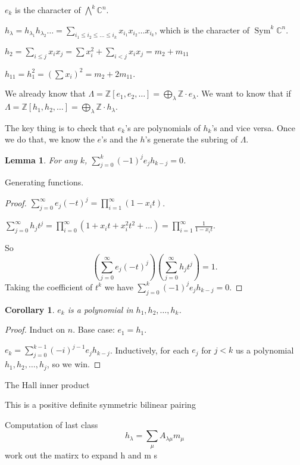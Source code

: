 \documentclass{report}
\newcommand{\C}{\mathbb{C}}
\newcommand{\Z}{\mathbb{Z}}
\def \Sym {\operatorname{Sym}}
\newtheorem{corollary}{Corollary}[section]
\newtheorem{lemma}{Lemma}[section]
\theoremstyle{definition}
\theoremstyle{remark}
\numberwithin{equation}{section}
\begin{document}
$e_k$ is the character of $\bigwedge^k \C^n$.

$h_\lambda = h_{\lambda_1}h_{\lambda_2}\ldots = \sum_{i_1 \leq i_2 \leq \ldots \leq i_k}x_{i_1}x_{i_2}\ldots x_{i_k}$, which is the character of $\Sym^k \C^n$.

$h_2 = \sum_{i \leq j}x_i x_j = \sum x_i^2 + \sum_{i < j} x_i x_j = m_2 + m_{11}$

$h_{11} = h_1^2 = \left(\sum x_i\right)^2 = m_2 + 2m_{11}$.

We already know that $\Lambda = \Z[e_1, e_2, \ldots] = \bigoplus_\lambda \Z \cdot e_\lambda$. We want to know that if $\Lambda = \Z[h_1, h_2, \ldots] = \bigoplus_\lambda \Z \cdot h_\lambda$.

The key thing is to check that $e_k$'s are polynomials of $h_k$'s and vice versa. Once we do that, we know the $e$'s and the $h$'s generate the subring of $\Lambda$.

\begin{lemma}
    For any $k$, $\sum_{j=0}^k (-1)^je_jh_{k-j} = 0$.
\end{lemma}
Generating functions.
\begin{proof}
    $\sum_{j=0}^\infty e_j (-t)^j = \prod_{i=1}^\infty (1 - x_i t)$.

    $\sum_{j=0}^\infty h_j t^j = \prod_{i=0}^\infty (1 + x_i t + x_i^2 t^2 + \ldots) = \prod_{i=1}^\infty \frac{1}{1 - x_it}$.

    So \[
        \left(\sum_{j=0}^\infty e_j (-t)^j\right)\left(\sum_{j=0}^\infty h_j t^j\right) = 1.
    \]
    Taking the coefficient of $t^k$ we have $\sum_{j=0}^k (-1)^je_jh_{k-j} = 0$.
\end{proof}

\begin{corollary}
    $e_k$ is a polynomial in $h_1, h_2, \ldots, h_k$.
\end{corollary}
\begin{proof}
    Induct on $n$. Base case: $e_1 = h_1$.

    $e_k = \sum_{j=0}^{k-1}(-i)^{j-1}e_j h_{k-j}$. Inductively, for each $e_j$ for $j < k$ us a polynomial $h_1, h_2, \ldots, h_j$, so we win.
\end{proof}

The Hall inner product

This is a positive definite symmetric bilinear pairing


Computation of last class \[
    h_\lambda = \sum_{\mu}A_{\lambda \mu} m_\mu   
\] work out the matirx to expand h and m s
\end{document}
